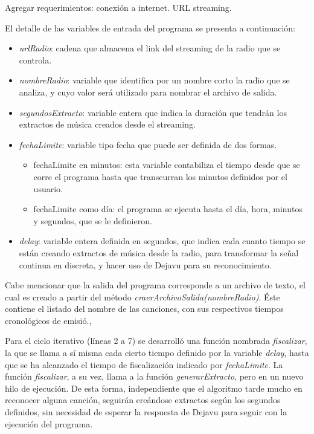 \begin{framed}

Agregar requerimientos: conexión a internet. URL streaming.

\end{framed}

El detalle de las variables de entrada del programa se presenta a continuación:

\begin{itemize}
\item \textit{urlRadio}: cadena que almacena el link del streaming de la radio que se controla.
\item \textit{nombreRadio}: variable que identifica por un nombre corto la radio que se analiza, y cuyo valor será utilizado para nombrar el archivo de salida.
\item \textit{segundosExtracto}: variable entera que indica la duración que tendrán los extractos de música creados desde el streaming.
\item \textit{fechaLimite}: variable tipo fecha que puede ser definida de dos formas.
\begin{itemize}
\item fechaLimite en minutos: esta variable contabiliza el tiempo desde que se corre el programa hasta que transcurran los minutos definidos por el usuario.
\item fechaLimite como día: el programa se ejecuta hasta el día, hora, minutos y segundos, que se le definieron.
\end{itemize}
\item \textit{delay}: variable entera definida en segundos, que indica cada cuanto tiempo se están creando extractos de música desde la radio, para transformar la señal continua en discreta, y hacer uso de Dejavu para su reconocimiento.
\end{itemize}

Cabe mencionar que la salida del programa corresponde a un archivo de texto, el cual es creado a partir del método \textit{craerArchivoSalida(nombreRadio)}. Éste contiene el listado del nombre de las canciones, con sus respectivos tiempos cronológicos de emisió., 

Para el ciclo iterativo (líneas 2 a 7) se desarrolló una función nombrada \textit{fiscalizar}, la que se llama a sí misma cada cierto tiempo definido por la variable \textit{delay}, hasta que se ha alcanzado el tiempo de fiscalización indicado por \textit{fechaLimite}. La función \textit{fiscalizar}, a su vez, llama a la función \textit{generarExtracto}, pero en un nuevo hilo de ejecución. De esta forma, independiente que el algoritmo tarde mucho en reconocer alguna canción, seguirán creándose extractos según los segundos definidos, sin necesidad de esperar la respuesta de Dejavu para seguir con la ejecución del programa.


